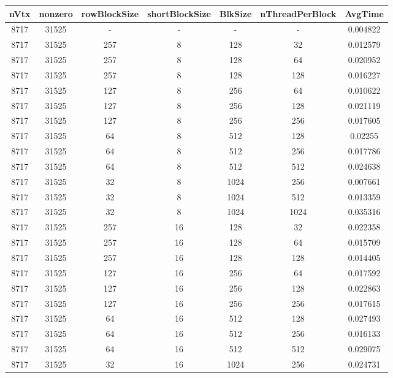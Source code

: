 \documentclass[9pt]{article}
\begin{document}
\SetBgPosition{0.25cm,-5.0cm}
\begin{tabular}{|c|c|c|c|c|c|c| }  
\hline
nVtx  & nonzero  & rowBlockSize  & shortBlockSize  & BlkSize  & nThreadPerBlock  & AvgTime \\
\hline
8717  & 31525  &  -  & -  & -  & -  &0.004822 \\
\hline
8717  & 31525  & 257  & 8  & 128  & 32  & 0.012579 \\
\hline
8717  & 31525  & 257  & 8  & 128  & 64  & 0.020952 \\
\hline
8717  & 31525  & 257  & 8  & 128  & 128  & 0.016227 \\
\hline
8717  & 31525  & 127  & 8  & 256  & 64  & 0.010622 \\
\hline
8717  & 31525  & 127  & 8  & 256  & 128  & 0.021119 \\
\hline
8717  & 31525  & 127  & 8  & 256  & 256  & 0.017605 \\
\hline
8717  & 31525  & 64  & 8  & 512  & 128  & 0.02255 \\
\hline
8717  & 31525  & 64  & 8  & 512  & 256  & 0.017786 \\
\hline
8717  & 31525  & 64  & 8  & 512  & 512  & 0.024638 \\
\hline
8717  & 31525  & 32  & 8  & 1024  & 256  & 0.007661 \\
\hline
8717  & 31525  & 32  & 8  & 1024  & 512  & 0.013359 \\
\hline
8717  & 31525  & 32  & 8  & 1024  & 1024  & 0.035316 \\
\hline
8717  & 31525  & 257  & 16  & 128  & 32  & 0.022358 \\
\hline
8717  & 31525  & 257  & 16  & 128  & 64  & 0.015709 \\
\hline
8717  & 31525  & 257  & 16  & 128  & 128  & 0.014405 \\
\hline
8717  & 31525  & 127  & 16  & 256  & 64  & 0.017592 \\
\hline
8717  & 31525  & 127  & 16  & 256  & 128  & 0.022863 \\
\hline
8717  & 31525  & 127  & 16  & 256  & 256  & 0.017615 \\
\hline
8717  & 31525  & 64  & 16  & 512  & 128  & 0.027493 \\
\hline
8717  & 31525  & 64  & 16  & 512  & 256  & 0.016133 \\
\hline
8717  & 31525  & 64  & 16  & 512  & 512  & 0.029075 \\
\hline
8717  & 31525  & 32  & 16  & 1024  & 256  & 0.024731 \\

\end{tabular}
\end{document}
